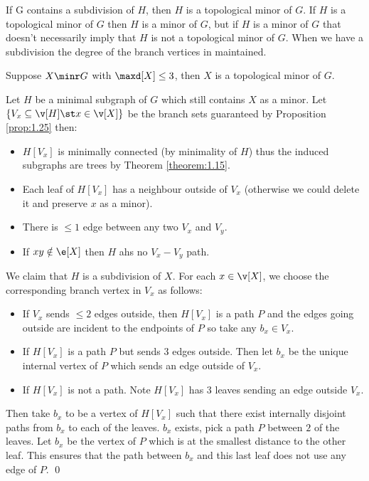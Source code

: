 If G contains a subdivision of $H$, then $H$ is a topological minor of $G$. If $H$ is a topological minor of $G$ then $H$ is a minor of $G$, but if $H$ is a minor of $G$ that doesn't necessarily imply that $H$ is not a topological minor of $G$. When we have a subdivision the degree of the branch vertices in maintained.
\begin{lemma}
    Suppose $X \minr G$ with $\maxd[X] \leq 3$, then $X$ is a topological minor of $G$.
\end{lemma}
\begin{prf}
    Let $H$ be a minimal subgraph of $G$ which still contains $X$ as a minor. Let $\{V_x \subseteq \v[H] \st x \in \v[X]\}$ be the branch sets guaranteed by Proposition \ref{prop:1.25} then:
    \begin{itemize}
        \item $H[V_x]$ is minimally connected (by minimality of $H$) thus the induced subgraphs are trees by Theorem \ref{theorem:1.15}.
        \item Each leaf of $H[V_x]$ has a neighbour outside of $V_x$ (otherwise we could delete it and preserve $x$ as a minor).
        \item There is $\leq 1$ edge between any two $V_x$ and $V_y$.
        \item If $xy \notin \e[X]$ then $H$ ahs no $V_x - V_y$ path.
    \end{itemize}
    We claim that $H$ is a subdivision of $X$. For each $x \in \v[X]$, we choose the corresponding branch vertex in $V_x$ as follows:
    \begin{itemize}
        \item If $V_x$ sends $\leq 2$ edges outside, then $H[V_x]$ is a path $P$ and the edges going outside are incident to the endpoints of $P$ so take any $b_x \in V_x$.
        \item If $H[V_x]$ is a path $P$ but sends $3$ edges outside. Then let $b_x$ be the unique internal vertex of $P$ which sends an edge outside of $V_x$.
        \item If $H[V_x]$ is not a path. Note $H[V_x]$ has $3$ leaves sending an edge outside $V_x.$
    \end{itemize}
    Then take $b_x$ to be a vertex of $H[V_x]$ such that there exist internally disjoint paths from $b_x$ to each of the leaves. $b_x$ exists, pick a path $P$ between $2$ of the leaves. Let $b_x$ be the vertex of $P$ which is at the smallest distance to the other leaf. This ensures that the path between $b_x$ and this last leaf does not use any edge of $P$. \qed
\end{prf}